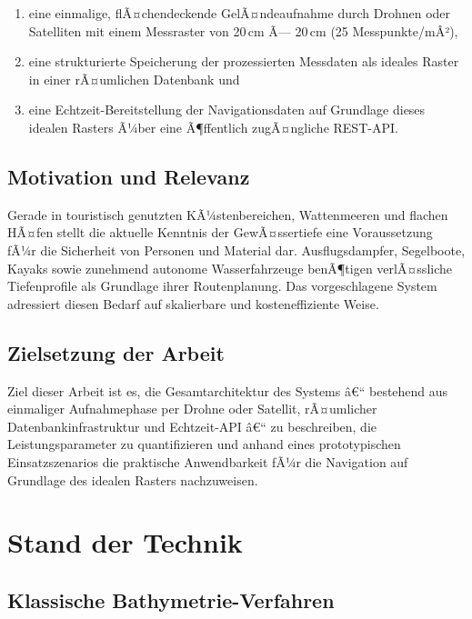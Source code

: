 ﻿\documentclass[a4paper,12pt]{article}
\theoremstyle{definition}
\begin{document}
\begin{enumerate}[label=\alph*)]
  \item eine einmalige, flÃ¤chendeckende GelÃ¤ndeaufnahme durch Drohnen oder Satelliten
        mit einem Messraster von 20\,cm Ã— 20\,cm (25 Messpunkte/mÂ²),
  \item eine strukturierte Speicherung der prozessierten Messdaten als ideales Raster
        in einer rÃ¤umlichen Datenbank und
  \item eine Echtzeit-Bereitstellung der Navigationsdaten auf Grundlage dieses idealen
        Rasters Ã¼ber eine Ã¶ffentlich zugÃ¤ngliche REST-API.
\end{enumerate}

\subsection{Motivation und Relevanz}

Gerade in touristisch genutzten KÃ¼stenbereichen, Wattenmeeren und flachen HÃ¤fen stellt
die aktuelle Kenntnis der GewÃ¤ssertiefe eine Voraussetzung fÃ¼r die Sicherheit von Personen
und Material dar. Ausflugsdampfer, Segelboote, Kayaks sowie zunehmend autonome
Wasserfahrzeuge benÃ¶tigen verlÃ¤ssliche Tiefenprofile als Grundlage ihrer
Routenplanung. Das vorgeschlagene System adressiert diesen Bedarf auf skalierbare und
kosteneffiziente Weise.

\subsection{Zielsetzung der Arbeit}

Ziel dieser Arbeit ist es, die Gesamtarchitektur des Systems â€“ bestehend aus einmaliger
Aufnahmephase per Drohne oder Satellit, rÃ¤umlicher Datenbankinfrastruktur und
Echtzeit-API â€“ zu beschreiben, die Leistungsparameter zu quantifizieren und anhand eines
prototypischen Einsatzszenarios die praktische Anwendbarkeit fÃ¼r die Navigation auf
Grundlage des idealen Rasters nachzuweisen.

\section{Stand der Technik}

\subsection{Klassische Bathymetrie-Verfahren}
\end{document}
